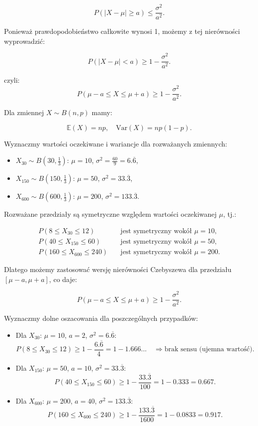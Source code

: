 \documentclass{article}
\begin{document}
\[
P(|X - \mu| \geq a) \leq \frac{\sigma^2}{a^2}.
\]

Ponieważ prawdopodobieństwo całkowite wynosi 1, możemy z tej nierówności wyprowadzić:

\[
P(|X - \mu| < a) \geq 1 - \frac{\sigma^2}{a^2}.
\]

czyli:
\[
P(\mu - a \leq X \leq \mu + a) \geq 1 - \frac{\sigma^2}{a^2}.
\]

Dla zmiennej \( X \sim B(n, p) \) mamy:

\[
\mathbb{E}(X) = np, \quad \mathrm{Var}(X) = np(1 - p).
\]

Wyznaczmy wartości oczekiwane i wariancje dla rozważanych zmiennych:

\begin{itemize}
    \item \( X_{30} \sim B(30, \frac{1}{3}) \): \quad \( \mu = 10 \), \( \sigma^2 = \frac{60}{9} = 6.\overline{6} \),
    \item \( X_{150} \sim B(150, \frac{1}{3}) \): \quad \( \mu = 50 \), \( \sigma^2 = 33.\overline{3} \),
    \item \( X_{600} \sim B(600, \frac{1}{3}) \): \quad \( \mu = 200 \), \( \sigma^2 = 133.\overline{3} \).
\end{itemize}

Rozważane przedziały są symetryczne względem wartości oczekiwanej \( \mu \), tj.:

\begin{align*}
P(8 \leq X_{30} \leq 12) &\quad \text{jest symetryczny wokół } \mu = 10, \\
P(40 \leq X_{150} \leq 60) &\quad \text{jest symetryczny wokół } \mu = 50, \\
P(160 \leq X_{600} \leq 240) &\quad \text{jest symetryczny wokół } \mu = 200.
\end{align*}

Dlatego możemy zastosować wersję nierówności Czebyszewa dla przedziału \( [\mu - a, \mu + a] \), co daje:

\[
P(\mu - a \leq X \leq \mu + a) \geq 1 - \frac{\sigma^2}{a^2}.
\]

Wyznaczmy dolne oszacowania dla poszczególnych przypadków:

\begin{itemize}
    \item Dla \( X_{30} \): \( \mu = 10 \), \( a = 2 \), \( \sigma^2 = 6.\overline{6} \):
    \[
    P(8 \leq X_{30} \leq 12) \geq 1 - \frac{6.\overline{6}}{4} = 1 - 1.666... \quad \Rightarrow \text{brak sensu (ujemna wartość)}.
    \]

    \item Dla \( X_{150} \): \( \mu = 50 \), \( a = 10 \), \( \sigma^2 = 33.\overline{3} \):
    \[
    P(40 \leq X_{150} \leq 60) \geq 1 - \frac{33.\overline{3}}{100} = 1 - 0.333 = 0.667.
    \]

    \item Dla \( X_{600} \): \( \mu = 200 \), \( a = 40 \), \( \sigma^2 = 133.\overline{3} \):
    \[
    P(160 \leq X_{600} \leq 240) \geq 1 - \frac{133.\overline{3}}{1600} = 1 - 0.0833 = 0.917.
    \]
\end{itemize}
\end{document}
